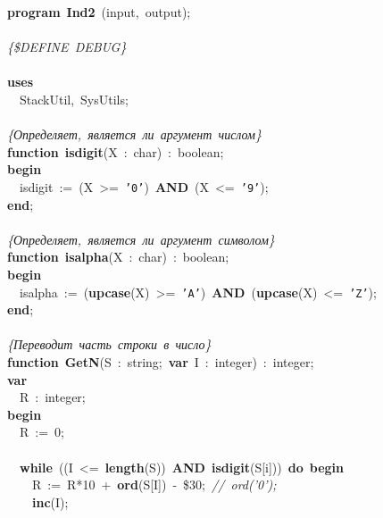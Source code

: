 \noindent
\mbox{}\textbf{program}\ \textbf{Ind2}\ (input,\ output); \\
\mbox{} \\
\mbox{}\textit{\{\$DEFINE\ DEBUG\}} \\
\mbox{} \\
\mbox{}\textbf{uses} \\
\mbox{}\ \ StackUtil,\ SysUtils; \\
\mbox{} \\
\mbox{}\textit{\{Определяет,\ является\ ли\ аргумент\ числом\}} \\
\mbox{}\textbf{function}\ \textbf{isdigit}(X\ :\ char)\ :\ boolean; \\
\mbox{}\textbf{begin} \\
\mbox{}\ \ isdigit\ :=\ (X\ \textgreater{}=\ \texttt{'0'})\ \textbf{AND}\ (X\ \textless{}=\ \texttt{'9'}); \\
\mbox{}\textbf{end}; \\
\mbox{} \\
\mbox{}\textit{\{Определяет,\ является\ ли\ аргумент\ символом\}} \\
\mbox{}\textbf{function}\ \textbf{isalpha}(X\ :\ char)\ :\ boolean; \\
\mbox{}\textbf{begin} \\
\mbox{}\ \ isalpha\ :=\ (\textbf{upcase}(X)\ \textgreater{}=\ \texttt{'A'})\ \textbf{AND}\ (\textbf{upcase}(X)\ \textless{}=\ \texttt{'Z'}); \\
\mbox{}\textbf{end}; \\
\mbox{} \\
\mbox{}\textit{\{Переводит\ часть\ строки\ в\ число\}} \\
\mbox{}\textbf{function}\ \textbf{GetN}(S\ :\ string;\ \textbf{var}\ I\ :\ integer)\ :\ integer; \\
\mbox{}\textbf{var} \\
\mbox{}\ \ R\ :\ integer; \\
\mbox{}\textbf{begin} \\
\mbox{}\ \ R\ :=\ 0; \\
\mbox{} \\
\mbox{}\ \ \textbf{while}\ ((I\ \textless{}=\ \textbf{length}(S))\ \textbf{AND}\ \textbf{isdigit}(S[i]))\ \textbf{do}\ \textbf{begin} \\
\mbox{}\ \ \ \ R\ :=\ R*10\ +\ \textbf{ord}(S[I])\ -\ \$30;\ \textit{//\ ord('0');} \\
\mbox{}\ \ \ \ \textbf{inc}(I); \\
